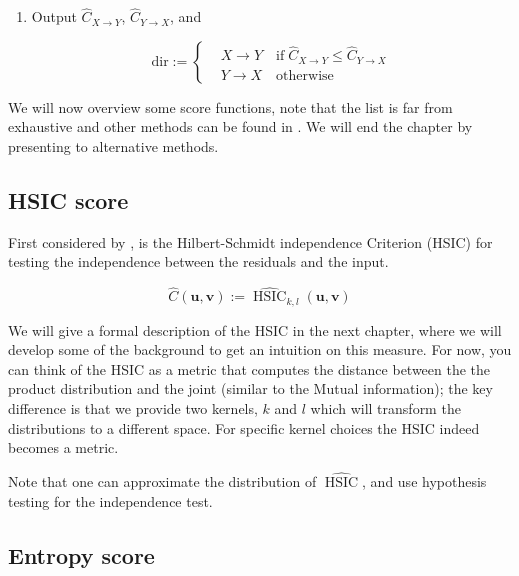 \begin{algorithm}
\begin{enumerate}
        \item Output $\hat{C}_{X \rightarrow Y}$, $\hat{C}_{Y \rightarrow X}$, and
        
        \[ 
        \text{dir} :=  
         \begin{cases} 
            & X \rightarrow Y \quad \text{if} \; \hat{C}_{X \rightarrow Y} \leq \hat{C}_{Y \rightarrow X}\\
            & Y \rightarrow X \quad \text{otherwise}
         \end{cases}
        \]
        
    \end{enumerate}

  \label{alg:anm_general}
  \end{algorithm}


  We will now overview some score functions, note that the list is far from exhaustive and other methods can be found 
  in \cite{Mooij2016jmlr}. We will end the chapter by presenting to alternative methods. 

\subsection{HSIC score}

First considered by \cite{hoyer2009nonlinear}, is the Hilbert-Schmidt independence Criterion (HSIC) for
testing the independence between the residuals and the input. 

$$
  \hat{C}(\mathbf{u}, \mathbf{v}) := \widehat{\operatorname{HSIC}}_{k, l} (\mathbf{u}, \mathbf{v})
$$

We will give a formal description of the HSIC in the next chapter, where we will develop some of the background 
to get an intuition on this measure. For now, you can think of the HSIC as a metric that computes the distance 
between the the product distribution and the joint (similar to the Mutual information); the key difference is that 
we provide two kernels, $k$ and $l$ which will transform the distributions to a different space. For specific 
kernel choices the HSIC indeed becomes a metric. 

Note that one can approximate the distribution of $\widehat{\operatorname{HSIC}}$, and use hypothesis testing 
for the independence test. 

\subsection{Entropy score}

